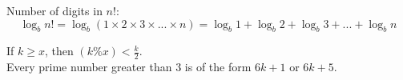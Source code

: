 Number of digits in $n!$:
  $$ \log _{b} n! = \log _{b} (1 \times 2 \times 3 \times ... \times n) = \log _{b} 1 + \log _{b} 2 + \log _{b} 3 + ... + \log _{b} n $$

If $k \geq x$, then $(k \% x) < \frac{k}{2}$.\\
\hfill \break
Every prime number greater than $3$ is of the form $6k + 1$ or $6k + 5$.
